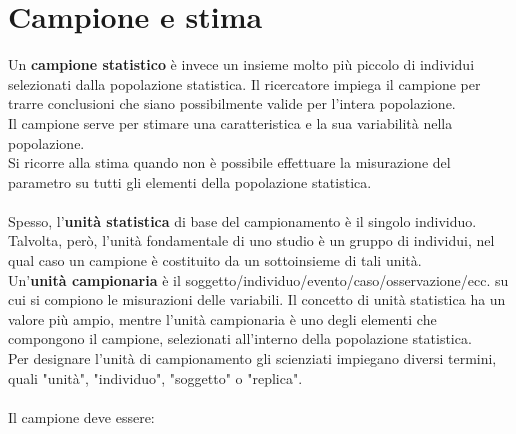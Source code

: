 \documentclass[10pt, draft]{book}
\begin{document}
\section{Campione e stima}
Un \textbf{campione statistico} è invece un insieme molto più piccolo di individui selezionati dalla popolazione statistica. Il ricercatore impiega il campione per trarre conclusioni che siano possibilmente valide per l'intera popolazione. 
\\
Il campione serve per stimare una caratteristica e la sua variabilità nella popolazione.
\\
Si ricorre alla stima quando non è possibile effettuare la misurazione del parametro su tutti gli elementi della popolazione statistica.
\\
\\
Spesso, l'\textbf{unità statistica} di base del campionamento è il singolo individuo. Talvolta, però, l'unità fondamentale di uno studio è un gruppo di individui, nel qual caso un campione è costituito da un sottoinsieme di tali unità. 
\\
Un’\textbf{unità campionaria} è il soggetto/individuo/evento/caso/osservazione/ecc. su cui si compiono le misurazioni delle variabili. Il concetto di unità statistica ha un valore più ampio, mentre l’unità campionaria è uno degli elementi che compongono il campione, selezionati all’interno della popolazione statistica.
\\
Per designare l'unità di campionamento gli scienziati impiegano diversi termini, quali "unità", "individuo", "soggetto" o "replica".
\\
\\
Il campione deve essere:
\end{document}
